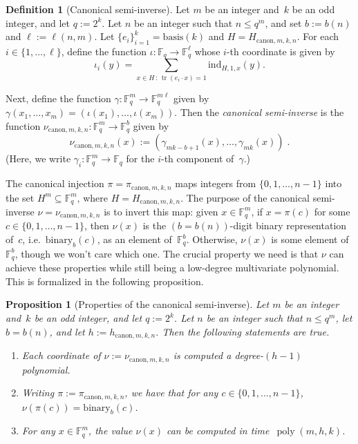 \documentclass[11pt]{article}
\newtheorem{proposition}[theorem]{Proposition}
\theoremstyle{definition}
\newtheorem{definition}[theorem]{Definition}
\newcommand{\F}{\ensuremath{\mathbb{F}}}
\newcommand{\ind}{\ensuremath{\textrm{ind}}}
\DeclareMathOperator{\poly}{poly}
\DeclareMathOperator{\tr}{tr}
\newcommand{\binary}[1]{\mathrm{binary}_{#1}}
\newcommand{\canbasis}[1]{\mathrm{basis}(#1)}
\newcommand{\canH}[3]{H_{\mathrm{canon}, #1, #2, #3}}
\newcommand{\canlilh}[3]{h_{\mathrm{canon}, #1, #2, #3}}
\newcommand{\canin}[3]{\pi_{\mathrm{canon},#1,#2,#3}}
\begin{document}
\begin{definition}[Canonical semi-inverse]
  \label{def:semi-inverse}
  Let $m$ be an integer and~$k$ be an odd integer, and let $q := 2^k$.
  Let $n$ be an integer such that $n \le q^m$, and set $b:=b(n)$ and
  $\ell:=\ell(n,m)$.
  Let $\{e_i\}_{i=1}^k = \canbasis{k}$ and $H = \canH{m}{k}{n}$.
  For each $i \in \{1, \ldots, \ell\}$, define the function $\iota:\F_q
  \rightarrow \F_q^\ell$ whose $i$-th coordinate is given by
  \begin{equation*}
    \iota_i(y) = \sum_{x \in H \,:\, \tr(e_i \cdot x) = 1} \ind_{H,1 ,x}(y).
  \end{equation*}

  Next, define the function $\gamma:\F_q^m \rightarrow \F_q^{m\ell}$ given by
  $\gamma(x_1, \ldots, x_m) = (\iota(x_1), \ldots, \iota(x_m))$.
  Then the \emph{canonical semi-inverse} is the function
  $\nu_{\mathrm{canon},m,k,n} : \F_q^m \rightarrow \F_q^b$ given by
  \begin{equation*}
    \nu_{\mathrm{canon},m,k,n}(x)
    := (\gamma_{mk-b+1}(x), \ldots, \gamma_{mk}(x))\;.
  \end{equation*}
  (Here, we write $\gamma_i:\F_q^m \rightarrow \F_q$ for the $i$-th component
  of~$\gamma$.)
\end{definition}

The canonical injection $\pi = \canin{m}{k}{n}$ maps integers from $\{0, 1,
\ldots, n-1\}$ into the set $H^m\subseteq \F_q^m$, where $H = \canH{m}{k}{n}$.
The purpose of the canonical semi-inverse $\nu = \nu_{\mathrm{canon},m,k,n}$ is
to invert this map: given $x \in \F_q^m$, if $x = \pi(c)$ for some $c \in \{0,
1, \ldots, n-1\}$, then $\nu(x)$ is the $(b = b(n))$-digit binary representation
of~$c$, i.e.\ $\binary{b}(c)$, as an element of~$\F_q^b$.
Otherwise, $\nu(x)$ is some element of $\F_q^b$, though we won't care which one.
The crucial property we need is that $\nu$ can achieve these properties while
still being a low-degree multivariate polynomial.
This is formalized in the following proposition.

\begin{proposition}[Properties of the canonical semi-inverse]
  \label{prop:true-canonical-inverse-stories}
  Let $m$ be an integer and~$k$ be an odd integer, and let $q := 2^k$.
  Let $n$ be an integer such that $n \le q^m$, let $b = b(n)$, and let $h:=
  \canlilh{m}{k}{n}$.
  Then the following statements are true.
  \begin{enumerate}
  \item Each coordinate of $\nu:= \nu_{\mathrm{canon},m,k,n}$ is computed a
    degree-$(h-1)$ polynomial.
  \item Writing $\pi:=\canin{m}{k}{n}$, we have that for any $c \in \{0, 1,
    \ldots, n-1\}$, $\nu(\pi(c)) = \binary{b}(c)$.
  \item For any $x \in \F_q^m$, the value $\nu(x)$ can be computed in
    time~$\poly(m, h, k)$.
  \end{enumerate}
\end{proposition}
\end{document}
